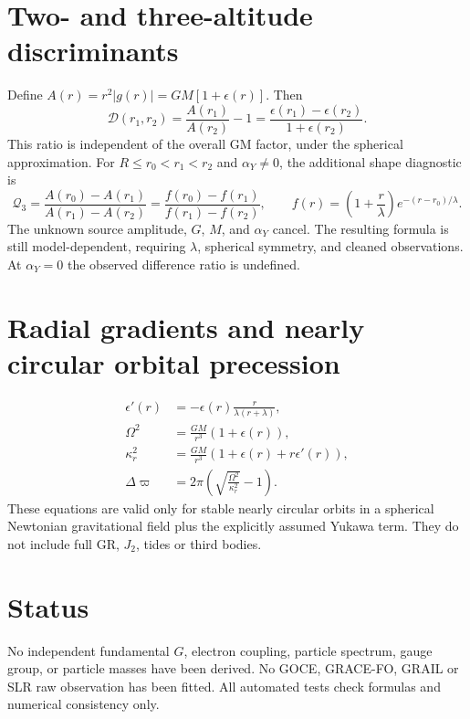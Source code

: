 \documentclass[11pt]{article}
\begin{document}
\section{Two- and three-altitude discriminants}
Define $A(r)=r^2|g(r)|=GM[1+\epsilon(r)]$. Then
\begin{equation}
\boxed{\mathcal{D}(r_1,r_2)=\frac{A(r_1)}{A(r_2)}-1
=\frac{\epsilon(r_1)-\epsilon(r_2)}{1+\epsilon(r_2)}}.
\end{equation}
This ratio is independent of the overall GM factor, under the spherical approximation.
For $R\le r_0<r_1<r_2$ and $\alpha_Y\ne0$, the additional shape diagnostic is
\begin{equation}
\boxed{\mathcal{Q}_3=\frac{A(r_0)-A(r_1)}{A(r_1)-A(r_2)}
=\frac{f(r_0)-f(r_1)}{f(r_1)-f(r_2)}},\qquad
f(r)=\left(1+\frac r\lambda\right)e^{-(r-r_0)/\lambda}.
\end{equation}
The unknown source amplitude, $G$, $M$, and $\alpha_Y$ cancel. The resulting formula is still model-dependent, requiring $\lambda$, spherical symmetry, and cleaned observations. At $\alpha_Y=0$ the observed difference ratio is undefined.
\section{Radial gradients and nearly circular orbital precession}
\begin{align}
\epsilon'(r)&=-\epsilon(r)\frac{r}{\lambda(r+\lambda)},\\
\Omega^2&=\frac{GM}{r^3}(1+\epsilon(r)),\\
\kappa_r^2&=\frac{GM}{r^3}(1+\epsilon(r)+r\epsilon'(r)),\\
\Delta\varpi&=2\pi\left(\sqrt{\frac{\Omega^2}{\kappa_r^2}}-1\right).
\end{align}
These equations are valid only for stable nearly circular orbits in a spherical Newtonian gravitational field plus the explicitly assumed Yukawa term. They do not include full GR, $J_2$, tides or third bodies.
\section{Status}
No independent fundamental $G$, electron coupling, particle spectrum, gauge group, or particle masses have been derived. No GOCE, GRACE-FO, GRAIL or SLR raw observation has been fitted. All automated tests check formulas and numerical consistency only.
\end{document}
